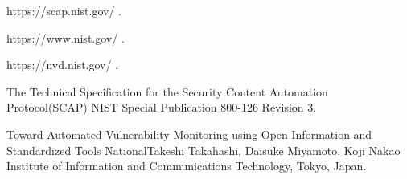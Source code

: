 \documentclass{llncs}
\begin{document}
\begin{thebibliography}{[MT1]}

%

https://scap.nist.gov/ .

https://www.nist.gov/ .

https://nvd.nist.gov/ .


The Technical Specification for the
Security Content Automation Protocol(SCAP)
NIST Special Publication 800-126
Revision 3.

Toward Automated Vulnerability Monitoring using
Open Information and Standardized Tools
NationalTakeshi Takahashi, Daisuke Miyamoto, Koji Nakao
Institute of Information and Communications Technology, Tokyo, Japan.

%
\end{thebibliography}
\end{document}

